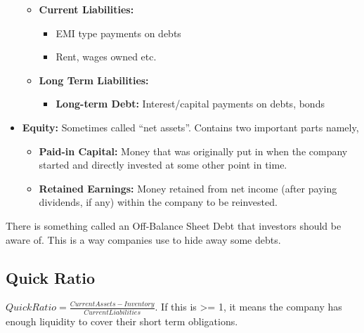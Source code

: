 \begin{itemize}
\begin{itemize}
	\item \textbf{Current Liabilities:} 
		\begin{itemize}
		\item EMI type payments on debts
		\item Rent, wages owned etc.
		\end{itemize}
	\item \textbf{Long Term Liabilities:}
		\begin{itemize}
		\item \textbf{Long-term Debt:} Interest/capital payments on debts, bonds
		\end{itemize}
	\end{itemize}		
\item \textbf{Equity:} Sometimes called ``net assets''. Contains two important parts namely,
	\begin{itemize}
	\item \textbf{Paid-in Capital:} Money that was originally put in when the company started and directly invested at some other point in time.
	\item \textbf{Retained Earnings:} Money retained from net income (after paying dividends, if any) within the company to be reinvested.
	\end{itemize}
\end{itemize}

There is something called an Off-Balance Sheet Debt that investors should be aware of. This is a way companies use to hide away some debts. 

\subsection{Quick Ratio}
$Quick Ratio = \frac{Current Assets - Inventory}{Current Liabilities}$. If this is >= 1, it means the company has enough liquidity to cover their short term obligations. 
